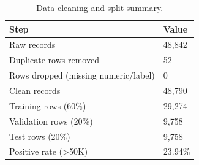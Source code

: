 \begin{table}
\caption{Data cleaning and split summary.}
\label{tab:data}
\begin{tabular}{ll}
\toprule
Step & Value \\
\midrule
Raw records & 48,842 \\
Duplicate rows removed & 52 \\
Rows dropped (missing numeric/label) & 0 \\
Clean records & 48,790 \\
Training rows (60\%) & 29,274 \\
Validation rows (20\%) & 9,758 \\
Test rows (20\%) & 9,758 \\
Positive rate (>50K) & 23.94\% \\
\bottomrule
\end{tabular}
\end{table}
